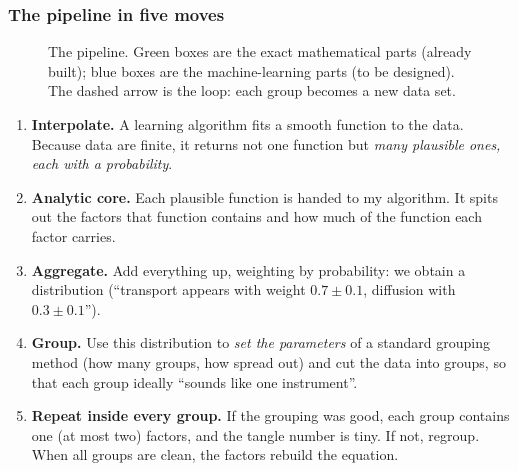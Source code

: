 \subsubsection*{The pipeline in five moves}
\begin{figure}[!htb]
\centering
{}
\caption{The pipeline. Green boxes are the exact mathematical parts (already built); blue boxes are the machine-learning parts (to be designed). The dashed arrow is the loop: each group becomes a new data set.}
\label{fig:pipe}
\end{figure}

\begin{enumerate}[leftmargin=*]
\item \textbf{Interpolate.} A learning algorithm fits a smooth function to the data. Because data are finite, it returns not one function but \emph{many plausible ones, each with a probability}.
\item \textbf{Analytic core.} Each plausible function is handed to my algorithm. It spits out the factors that function contains and how much of the function each factor carries.
\item \textbf{Aggregate.} Add everything up, weighting by probability: we obtain a distribution (``transport appears with weight $0.7\pm0.1$, diffusion with $0.3\pm0.1$'').
\item \textbf{Group.} Use this distribution to \emph{set the parameters} of a standard grouping method (how many groups, how spread out) and cut the data into groups, so that each group ideally ``sounds like one instrument''.
\item \textbf{Repeat inside every group.} If the grouping was good, each group contains one (at most two) factors, and the tangle number is tiny. If not, regroup. When all groups are clean, the factors rebuild the equation.
\end{enumerate}

